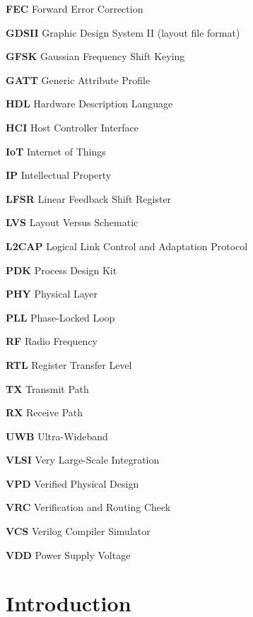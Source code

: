 \documentclass[12pt,singleside,a4paper]{report}
\begin{document}
\noindent \textbf{FEC} \quad Forward Error Correction

\noindent \textbf{GDSII} \quad Graphic Design System II (layout file format)

\noindent \textbf{GFSK} \quad Gaussian Frequency Shift Keying

\noindent \textbf{GATT} \quad Generic Attribute Profile

\noindent \textbf{HDL} \quad Hardware Description Language

\noindent \textbf{HCI} \quad Host Controller Interface

\noindent \textbf{IoT} \quad Internet of Things

\noindent \textbf{IP} \quad Intellectual Property

\noindent \textbf{LFSR} \quad Linear Feedback Shift Register

\noindent \textbf{LVS} \quad Layout Versus Schematic

\noindent \textbf{L2CAP} \quad Logical Link Control and Adaptation Protocol

\noindent \textbf{PDK} \quad Process Design Kit

\noindent \textbf{PHY} \quad Physical Layer

\noindent \textbf{PLL} \quad Phase-Locked Loop

\noindent \textbf{RF} \quad Radio Frequency

\noindent \textbf{RTL} \quad Register Transfer Level

\noindent \textbf{TX} \quad Transmit Path

\noindent \textbf{RX} \quad Receive Path

\noindent \textbf{UWB} \quad Ultra-Wideband

\noindent \textbf{VLSI} \quad Very Large-Scale Integration

\noindent \textbf{VPD} \quad Verified Physical Design

\noindent \textbf{VRC} \quad Verification and Routing Check

\noindent \textbf{VCS} \quad Verilog Compiler Simulator

\noindent \textbf{VDD} \quad Power Supply Voltage

\clearpage


\chapter{Introduction}\label{hints}
\end{document}
